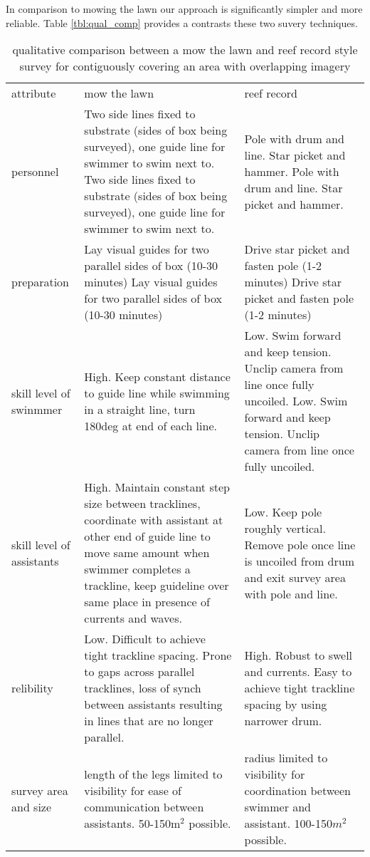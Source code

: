 In comparison to mowing the lawn \cite{Mahon_2011} our approach is significantly simpler and more reliable. Table \ref{tbl:qual_comp} provides a contrasts these two suvery techniques.
\begin{table} 
    \begin{tabular}{ | p{} | p{} | p{} |}
    \hline
attribute & mow the lawn & reef record \\
        personnel & Two side lines fixed to substrate (sides of box being surveyed), one guide line for swimmer to swim next to. Two side lines fixed to substrate (sides of box being surveyed), one guide line for swimmer to swim next to. & Pole with drum and line. Star picket and hammer. Pole with drum and line. Star picket and hammer. \\ 
        \hline
        preparation & Lay visual guides for two parallel sides of box (10-30 minutes) Lay visual guides for two parallel sides of box (10-30 minutes) & Drive star picket and fasten pole (1-2 minutes) Drive star picket and fasten pole (1-2 minutes) \\ 
        \hline
        skill level of swinmmer & High. Keep constant distance to guide line while swimming in a straight line, turn 180deg at end of each line. & Low. Swim forward and keep tension. Unclip camera from line once fully uncoiled. Low. Swim forward and keep tension. Unclip camera from line once fully uncoiled. \\ 
        \hline
        skill level of assistants & High. Maintain constant step size between tracklines, coordinate with assistant at other end of guide line to move same amount when swimmer completes a trackline, keep guideline over same place in presence of currents and waves. & Low. Keep pole roughly vertical. Remove pole once line is uncoiled from drum and exit survey area with pole and line. \\
        \hline
        relibility & Low. Difficult to achieve tight trackline spacing. Prone to gaps across parallel tracklines, loss of synch between assistants resulting in lines that are no longer parallel. & High. Robust to swell and currents. Easy to achieve tight trackline spacing by using narrower drum. \\ 
        \hline
        survey area and size & length of the legs limited to visibility for ease of communication between assistants. 50-150m$^2$ possible.   & radius limited to visibility for coordination between swimmer and assistant. 100-150$m^2$ possible.    \\ 
        \hline
    \end{tabular} 
    \caption{qualitative comparison between a mow the lawn and reef record style survey for contiguously covering an area with overlapping imagery} 
\end{table}


